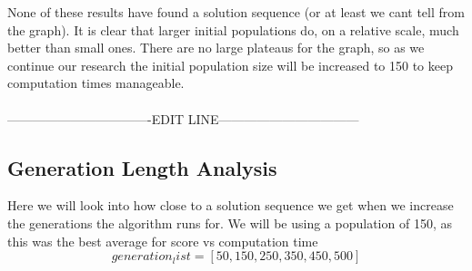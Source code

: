 

None of these results have found a solution sequence (or at least we cant tell from the graph). 
It is clear that larger initial populations do, on a relative scale, much better than small ones.
There are no large plateaus for the graph, so as we continue our research the initial population size will be increased to 150 to keep computation times manageable.\\
\\----------------------------------EDIT LINE---------------------------------\\

\subsection{Generation Length Analysis}
Here we will look into how close to a solution sequence we get when we increase the generations the algorithm runs for. We will be using a population of 150, as this was the best average for score vs computation time\\
    
    \[generation_list = [50,150,250,350,450,500]\]

